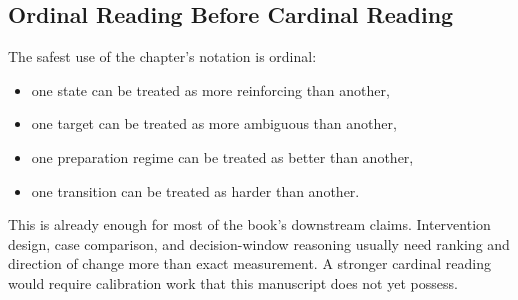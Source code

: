 \subsection{Ordinal Reading Before Cardinal Reading}

The safest use of the chapter's notation is ordinal:
\begin{itemize}[nosep]
  \item one state can be treated as more reinforcing than another,
  \item one target can be treated as more ambiguous than another,
  \item one preparation regime can be treated as better than another,
  \item one transition can be treated as harder than another.
\end{itemize}

This is already enough for most of the book's downstream claims. Intervention
design, case comparison, and decision-window reasoning usually need ranking and
direction of change more than exact measurement. A stronger cardinal reading
would require calibration work that this manuscript does not yet possess.
